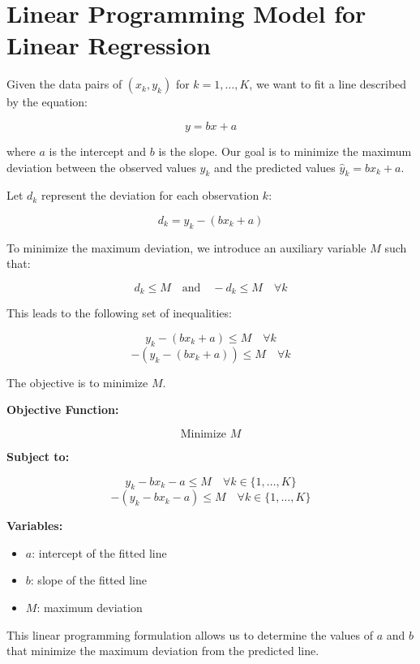 \documentclass{article}
\begin{document}
\section*{Linear Programming Model for Linear Regression}

Given the data pairs of \( (x_k, y_k) \) for \( k = 1, \ldots, K \), we want to fit a line described by the equation:

\[
y = bx + a
\]

where \( a \) is the intercept and \( b \) is the slope. Our goal is to minimize the maximum deviation between the observed values \( y_k \) and the predicted values \( \hat{y}_k = bx_k + a \).

Let \( d_k \) represent the deviation for each observation \( k \):

\[
d_k = y_k - (bx_k + a)
\]

To minimize the maximum deviation, we introduce an auxiliary variable \( M \) such that:

\[
d_k \leq M \quad \text{and} \quad -d_k \leq M \quad \forall k
\]

This leads to the following set of inequalities:

\[
y_k - (bx_k + a) \leq M \quad \forall k
\]
\[
-(y_k - (bx_k + a)) \leq M \quad \forall k
\]

The objective is to minimize \( M \).

\textbf{Objective Function:}

\[
\text{Minimize } M
\]

\textbf{Subject to:}

\[
y_k - bx_k - a \leq M \quad \forall k \in \{1, \ldots, K\}
\]
\[
-(y_k - bx_k - a) \leq M \quad \forall k \in \{1, \ldots, K\}
\]

\textbf{Variables:}
\begin{itemize}
    \item \( a \): intercept of the fitted line
    \item \( b \): slope of the fitted line
    \item \( M \): maximum deviation
\end{itemize}

This linear programming formulation allows us to determine the values of \( a \) and \( b \) that minimize the maximum deviation from the predicted line.
\end{document}
